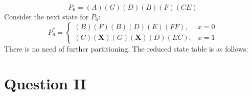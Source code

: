 \documentclass[12pt, a4paper]{article}
\begin{document}
	$$P_6 = (A)(G)(D)(B)(F)(CE)$$
	Consider the next state for $P_6$:
	\[
		P_6^* =
		\left.
		\begin{cases}
			(B)(F)(B)(D)(E)(FF), & x = 0 \\
			(C)(\textbf{X})(G)(\textbf{X})(D)(EC), & x = 1
		\end{cases}
		\right.
	\]	
	There is no need of further partitioning. The reduced state table is as follows:
	\begin{center}
	\end{center}
	
	\section*{Question II}
\end{document}
